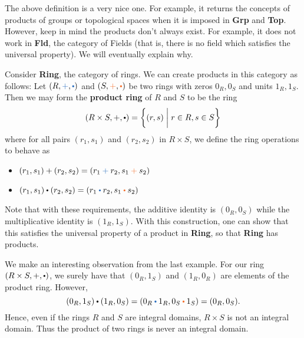     The above definition is a very nice one. For example, it returns the 
    concepts of products of groups or topological spaces when it is imposed 
    in \textbf{Grp} and \textbf{Top}. However, keep in mind the products don't 
    always exist. For example, it does not work in \textbf{Fld}, 
    the category of Fields (that is, there is no field which satisfies the universal property). 
    We will eventually explain why.

    \begin{example}
        Consider \textbf{Ring}, the category of rings. We can create products in this category 
        as follows: Let $(R, \mathbin{\textcolor{NavyBlue}{+}}, \mathbin{\textcolor{NavyBlue}{\bigcdot}})$
        and $(S, \mathbin{\textcolor{Orange}{+}}, \textcolor{Orange}{\bigcdot})$ be two rings 
        with zeros $0_R, 0_S$ and units $1_R, 1_S$. 
        Then we may form the \textbf{product ring} of $R$ and $S$ to be the ring 
        \[
            (R \times S, +, \bigcdot) = \bigg\{(r, s) \;\bigg| \; r \in R, s \in S \bigg\}
        \]
        where for all pairs $(r_1, s_1)$ and $(r_2, s_2)$ in $R \times S$, we define the ring operations to behave as
        \begin{itemize}
            \item $(r_1, s_1) + (r_2, s_2) = (r_1 \mathbin{\textcolor{NavyBlue}{+}} r_2, s_1 \mathbin{\textcolor{Orange}{+}} s_2)$ 
            \item $(r_1, s_1)\mathbin{\bigcdot} (r_2, s_2) = (r_1 \mathbin{\textcolor{NavyBlue}{\bigcdot}} r_2, s_1 \mathbin{\textcolor{Orange}{\bigcdot}} s_2)$
        \end{itemize}
        Note that with these requirements, the additive identity is $(0_R, 0_S)$ while the multiplicative identity 
        is $(1_R, 1_S)$. With this construction, one can show that this satisfies the universal property 
        of a product in \textbf{Ring}, so that \textbf{Ring} has products. 
    \end{example}

    We make an interesting observation from the last example. For our ring $(R \times S, +, \bigcdot)$, 
    we surely have that $(0_R, 1_S)$ and $(1_R, 0_R)$ are elements of the product ring. However, 
    \[
        (0_R, 1_S) \mathbin{\bigcdot} (1_R, 0_S) = (0_R \mathbin{\textcolor{NavyBlue}{\bigcdot}} 1_R, 0_S \mathbin{\textcolor{Orange}{\bigcdot}} 1_S)
        = 
        (0_R, 0_S).
    \]
    Hence, even if the rings $R$ and $S$ are integral domains, $R \times S$ is not an integral domain. 
    Thus the product of two rings is never an integral domain. 

